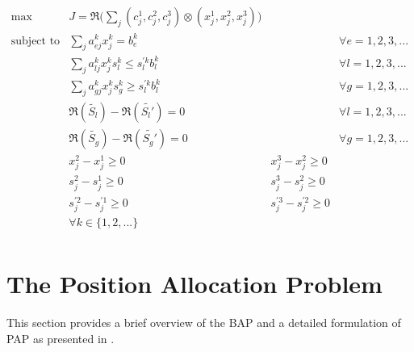 \documentclass[11pt,a4paper,final]{article}
\begin{document}
\begin{equation}
\label{eq:kumar-kaurs-crisp}
\begin{array}{lllc}
\text{max}    & J = \mathfrak{R}\Big(\sum_j (c_j^1,c_j^2,c_j^3) \otimes (x_j^1,x_j^2,x_j^3)\Big) &                             &                                          \\
\text{subject to}  & \sum_j a_{ej}^k x_j^k = b_e^k                                &                                &   \forall e = 1,2,3,...        \\
                   & \sum_j a_{lj}^k x_j^k s_l^k \le s_l^{'k} b_l^k                 &                                &   \forall l = 1,2,3,...       \\
                   & \sum_j a_{gj}^k x_j^k s_g^k \ge s_l^{'k} b_l^k                 &                                &   \forall g = 1,2,3,...      \\
                   & \mathfrak{R}(\tilde{S_l}) - \mathfrak{R}(\tilde{S_l'}) = 0                      &                                &  \forall l = 1,2,3,...          \\
                   & \mathfrak{R}(\tilde{S_g}) - \mathfrak{R}(\tilde{S_g'}) = 0                      &                                &  \forall g = 1,2,3,...          \\
                   & x_j^2 - x_j^1 \ge 0                                              &x_j^3 - x_j^2 \ge 0 &         \\
                   & s_j^2 - s_j^1 \ge 0                                              &s_j^3 - s_j^2 \ge 0 &         \\
                   & s_j^{'2} - s_j^{'1} \ge 0                                        &s_j^{'3} - s_j^{'2} \ge 0 & \\
                   & \forall k \in \{1,2,...\}                                            &                            &                       \\
\end{array}
\end{equation}
\section{The Position Allocation Problem}
\label{sec:the-position-allocation-problem}
This section provides a brief overview of the BAP and a detailed formulation of PAP as presented in
\cite{qarebagh-2019-optim-sched}.
\end{document}
